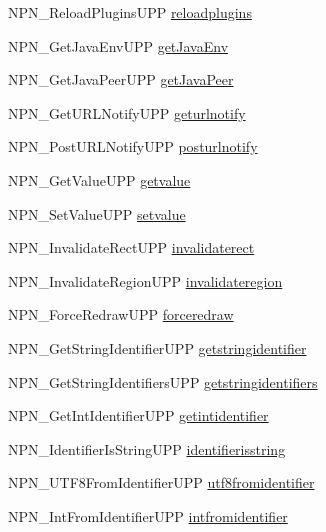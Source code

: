 \begin{DoxyCompactItemize}
\item 
NPN\_\-ReloadPluginsUPP \hyperlink{struct___n_p_netscape_funcs_aa85340e417d93dfcc7708bbcfa3d9c12}{reloadplugins}
\item 
NPN\_\-GetJavaEnvUPP \hyperlink{struct___n_p_netscape_funcs_a3b0a3e92ed9740cac77d82fdd8b8d475}{getJavaEnv}
\item 
NPN\_\-GetJavaPeerUPP \hyperlink{struct___n_p_netscape_funcs_a6975746fc043d1ec514d3703a227d161}{getJavaPeer}
\item 
NPN\_\-GetURLNotifyUPP \hyperlink{struct___n_p_netscape_funcs_ae7f75d56c2d0608c7fcd638119d727ac}{geturlnotify}
\item 
NPN\_\-PostURLNotifyUPP \hyperlink{struct___n_p_netscape_funcs_a2e52b2a642eb0b8d9cacebf9d412c5ac}{posturlnotify}
\item 
NPN\_\-GetValueUPP \hyperlink{struct___n_p_netscape_funcs_a137b9d7552558dfddb1da2ba754ed073}{getvalue}
\item 
NPN\_\-SetValueUPP \hyperlink{struct___n_p_netscape_funcs_a95308df023af6ede425bd220371d2b50}{setvalue}
\item 
NPN\_\-InvalidateRectUPP \hyperlink{struct___n_p_netscape_funcs_a02a38e747a2da4b9736b24d822c10d6c}{invalidaterect}
\item 
NPN\_\-InvalidateRegionUPP \hyperlink{struct___n_p_netscape_funcs_ac382022e7d9c2c262454fe7288956e0d}{invalidateregion}
\item 
NPN\_\-ForceRedrawUPP \hyperlink{struct___n_p_netscape_funcs_aaa78ba91b0ac4e1a5d0b8902f013b8a8}{forceredraw}
\item 
NPN\_\-GetStringIdentifierUPP \hyperlink{struct___n_p_netscape_funcs_a60933fa78617d624dad58fbad07682e8}{getstringidentifier}
\item 
NPN\_\-GetStringIdentifiersUPP \hyperlink{struct___n_p_netscape_funcs_acd52b8aad9b9c097d7ef87e48843f3b8}{getstringidentifiers}
\item 
NPN\_\-GetIntIdentifierUPP \hyperlink{struct___n_p_netscape_funcs_ae7a860e929ae8b25d57fd2b658896da8}{getintidentifier}
\item 
NPN\_\-IdentifierIsStringUPP \hyperlink{struct___n_p_netscape_funcs_a7f1e30538e4d3869f932baec501978fc}{identifierisstring}
\item 
NPN\_\-UTF8FromIdentifierUPP \hyperlink{struct___n_p_netscape_funcs_ad25232852fd00d9d06492a14550b4c4c}{utf8fromidentifier}
\item 
NPN\_\-IntFromIdentifierUPP \hyperlink{struct___n_p_netscape_funcs_a8faaf389bec059a0f491051ea964cdb9}{intfromidentifier}
\item 

\end{DoxyCompactItemize}
